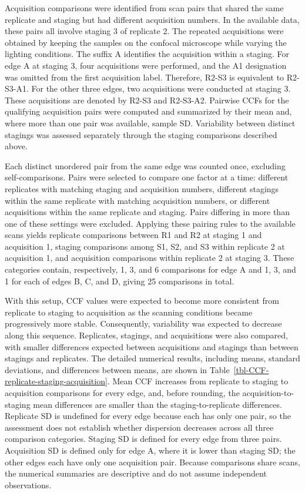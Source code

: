 \documentclass[11pt,a4paper]{article}
\begin{document}
Acquisition comparisons were identified from scan pairs that shared the
same replicate and staging but had different acquisition numbers. In the
available data, these pairs all involve staging 3 of replicate 2. The
repeated acquisitions were obtained by keeping the samples on the
confocal microscope while varying the lighting conditions. The suffix A
identifies the acquisition within a staging. For edge A at staging 3,
four acquisitions were performed, and the A1 designation was omitted
from the first acquisition label. Therefore, R2-S3 is equivalent to
R2-S3-A1. For the other three edges, two acquisitions were conducted at
staging 3. These acquisitions are denoted by R2-S3 and R2-S3-A2.
Pairwise CCFs for the qualifying acquisition pairs were computed and
summarized by their mean and, where more than one pair was available,
sample SD. Variability between distinct stagings was assessed separately
through the staging comparisons described above.

Each distinct unordered pair from the same edge was counted once,
excluding self-comparisons. Pairs were selected to compare one factor at
a time: different replicates with matching staging and acquisition
numbers, different stagings within the same replicate with matching
acquisition numbers, or different acquisitions within the same replicate
and staging. Pairs differing in more than one of these settings were
excluded. Applying these pairing rules to the available scans yields
replicate comparisons between R1 and R2 at staging 1 and acquisition 1,
staging comparisons among S1, S2, and S3 within replicate 2 at
acquisition 1, and acquisition comparisons within replicate 2 at staging
3. These categories contain, respectively, 1, 3, and 6 comparisons for
edge A and 1, 3, and 1 for each of edges B, C, and D, giving 25
comparisons in total.

With this setup, CCF values were expected to become more consistent from
replicate to staging to acquisition as the scanning conditions became
progressively more stable. Consequently, variability was expected to
decrease along this sequence. Replicates, stagings, and acquisitions
were also compared, with smaller differences expected between
acquisitions and stagings than between stagings and replicates. The
detailed numerical results, including means, standard deviations, and
differences between means, are shown in
Table~\ref{tbl-CCF-replicate-staging-acquisition}. Mean CCF increases
from replicate to staging to acquisition comparisons for every edge,
and, before rounding, the acquisition-to-staging mean differences are
smaller than the staging-to-replicate differences. Replicate SD is
undefined for every edge because each has only one pair, so the
assessment does not establish whether dispersion decreases across all
three comparison categories. Staging SD is defined for every edge from
three pairs. Acquisition SD is defined only for edge A, where it is
lower than staging SD; the other edges each have only one acquisition
pair. Because comparisons share scans, the numerical summaries are
descriptive and do not assume independent observations.
\end{document}
